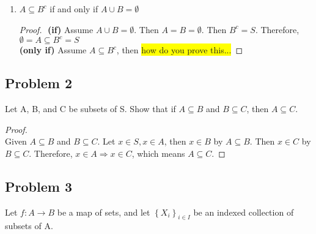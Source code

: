 \documentclass[11pt]{article}
\theoremstyle{plain}%
\theoremstyle{definition}
\theoremstyle{remark}
\newcommand{\hilight}[1]{\colorbox{yellow}{#1}}
\begin{document}
\begin{enumerate}
  \item $A\subseteq B^{c}$ if and only if $A\cup B = \emptyset$
    \begin{proof}
      $ $\newline
      \textbf{(if)}
      Assume $A\cup B = \emptyset$. Then $A=B=\emptyset$. Then $B^c = S$. Therefore, $\emptyset = A \subseteq B^c = S$ \\
      \textbf{(only if)}
      Assume $A\subseteq B^{c}$, then
      \hilight{how do you prove this...}
  \end{proof}
\end{enumerate}


\subsection*{Problem 2}
Let A, B, and C be subsets of S. Show that if $A\subseteq B$ and $B\subseteq C$, then $A\subseteq C$.

\begin{proof}
  $ $\\
  Given $A\subseteq B$ and $B\subseteq C$. Let $x\in S, x\in A$, then $x\in B$ by $A\subseteq B$. Then $x\in C$ by $B\subseteq C$. Therefore, $x\in A \Rightarrow x\in C$, which means $A\subseteq C$.
\end{proof}


\subsection*{Problem 3}
Let $f:A\to B$ be a map of sets, and let $\left\{X_{i}\right\}_{i\in I}$ be an indexed collection of subsets of A.
\end{document}
